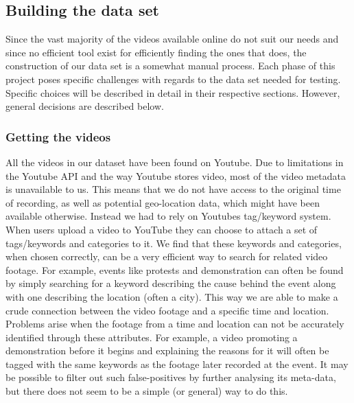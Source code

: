 \subsection{Building the data set}
%
Since the vast majority of the videos available online do not suit our needs and since no efficient tool exist for efficiently finding the ones that does, the construction of our data set is a somewhat manual process. Each phase of this project poses specific challenges with regards to the data set needed for testing. Specific choices will be described in detail in their respective sections. However, general decisions are described below.
%
\subsubsection{Getting the videos}
%
All the videos in our dataset have been found on Youtube. Due to limitations in the Youtube API and the way Youtube stores video, most of the video metadata is unavailable to us. This means that we do not have access to the original time of recording, as well as potential geo-location data, which might have been available otherwise. Instead we had to rely on Youtubes tag/keyword system. When users upload a video to YouTube they can choose to attach a set of tags/keywords and categories to it. We find that these keywords and categories, when chosen correctly, can be a very efficient way to search for related video footage. For example, events like protests and demonstration can often be found by simply searching for a keyword describing the cause behind the event along with one describing the location (often a city). This way we are able to make a crude connection between the video footage and a specific time and location. Problems arise when the footage from a time and location can not be accurately identified through these attributes. For example, a video promoting a demonstration before it begins and explaining the reasons for it will often be tagged with the same keywords as the footage later recorded at the event. It may be possible to filter out such false-positives by further analysing its meta-data, but there does not seem to be a simple (or general) way to do this.
%
%
